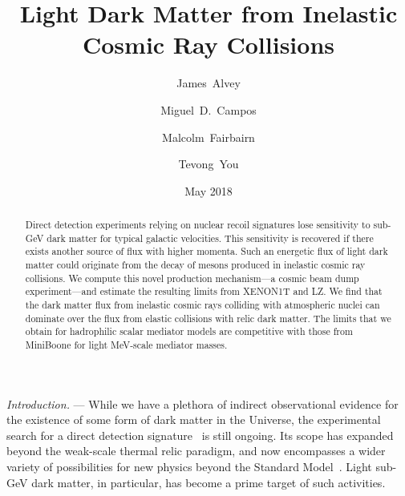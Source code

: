 \documentclass[prl,twocolumn,groupedaddress,nofootinbib, superscriptaddress]{revtex4-1}
\begin{document}
\rightline{}

\title{Light Dark Matter from Inelastic Cosmic Ray Collisions}




\author{James~Alvey} 
\author{Miguel~D.~Campos}
\author{Malcolm~Fairbairn}



\author{Tevong~You}


\date{May 2018}


\begin{abstract}
Direct detection experiments relying on nuclear recoil signatures lose sensitivity to sub-GeV dark matter for typical galactic velocities. This sensitivity is recovered if there exists another source of flux with higher momenta. Such an energetic flux of light dark matter could originate from the decay of mesons produced in inelastic cosmic ray collisions. We compute this novel production mechanism---a cosmic beam dump experiment---and estimate the resulting limits from XENON1T and LZ. We find that the dark matter flux from inelastic cosmic rays colliding with atmospheric nuclei can dominate over the flux from elastic collisions with relic dark matter. The limits that we obtain for hadrophilic scalar mediator models are competitive with those from MiniBoone for light MeV-scale mediator masses.
\end{abstract}



\maketitle 


{\it Introduction.} --- While we have a plethora of indirect observational evidence for the existence of some form of dark matter in the Universe, the experimental search for a direct detection signature~\cite{Goodman:1984dc} is still ongoing. Its scope has expanded beyond the weak-scale thermal relic paradigm, and now encompasses a wider variety of possibilities for new physics beyond the Standard Model~\cite{Battaglieri:2017aum}. Light sub-GeV dark matter, in particular, has become a prime target of such activities. 
\end{document}
